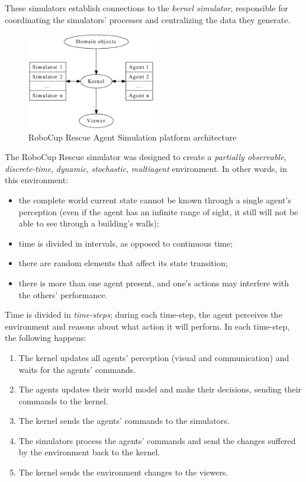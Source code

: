\documentclass{article}
\begin{document}
These simulators establish connections to the \emph{kernel simulator}, responsible for coordinating the simulators' processes and centralizing the data they generate.
\begin{figure}[ht]
  \centering
  \includegraphics[width=0.5\textwidth]{figs/simulator_architecture.eps}
  \caption{RoboCup Rescue Agent Simulation platform architecture~\cite{skinnerRamchurn2010}}
  \label{fig:simulator_architecture}
\end{figure}

The RoboCup Rescue simulator was designed to create a \emph{partially observable}, \emph{discrete-time}, \emph{dynamic}, \emph{stochastic}, \emph{multiagent} environment. In other words, in this environment:

\begin{itemize}
  \item the complete world current state cannot be known through a single agent's perception (even if the agent has an infinite range of sight, it still will not be able to see through a building's walls);
  \item time is divided in intervals, as opposed to continuous time;
  \item there are random elements that affect its state transition;
  \item there is more than one agent present, and one's actions may interfere with the others' performance.
\end{itemize}

Time is divided in \emph{time-steps}; during each time-step, the agent perceives the environment and reasons about what action it will perform. In each time-step, the following happens:
\begin{enumerate}
\label{enum:time-step}
  \item The kernel updates all agents' perception (visual and communication) and waits for the agents' commands.
  \item The agents updates their world model and make their decisions, sending their commands to the kernel.
  \item The kernel sends the agents' commands to the simulators.
  \item The simulators process the agents' commands and send the changes suffered by the environment back to the kernel.
  \item The kernel sends the environment changes to the viewers.
\end{enumerate}
\end{document}
